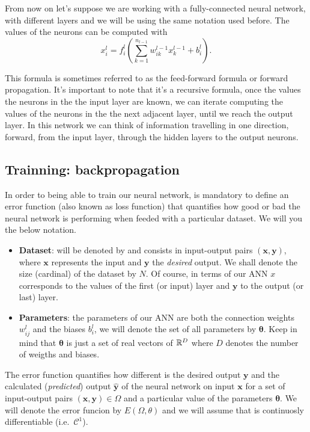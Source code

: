 From now on let's suppose we are working with a fully-connected neural network,
with different layers and we will be using the same notation used before. The
values of the neurons can be computed with
\begin{equation}
  x_i^l = f_i^l \left( \sum_{k=1}^{n_{l-1}} w_{ik}^{l-1} x_{k}^{l-1} + b_i^l \right).
\end{equation}

This formula is sometimes referred to as the feed-forward formula or forward
propagation. It's important to note that it's a recursive formula, once the
values the neurons in the the input layer are known, we can iterate computing
the values of the neurons in the the next adjacent layer, until we reach the
output layer. In this network we can think of information travelling in one
direction, forward, from the input layer, through the hidden layers to the
output neurons.

\subsection{Trainning: backpropagation}
\label{sec:backward}

In order to being able to train our neural network, is mandatory to define an
error function (also known as loss function) that quantifies how good or bad
the neural network is performing when feeded with a particular dataset. We will
you the below notation.
\begin{itemize}
  \item \textbf{Dataset}: will be denoted by and consists in input-output pairs
  \((\mathbf{x}, \mathbf{y})\), where \(\mathbf{x}\) represents the input and
  \(\mathbf{y}\) the \emph{desired} output. We shall denote the size (cardinal)
  of the dataset by \(N\). Of course, in terms of our ANN \(x\) corresponds to
  the values of the first (or input) layer and \(\mathbf{y}\) to the output (or
  last) layer.
  \item \textbf{Parameters}: the parameters of our ANN are both the connection
  weights \(w_{ij}^l\) and the biases \(b_i^l\), we will denote the set of all
  parameters by \(\bm{\theta}\). Keep in mind that \(\bm{\theta}\) is just a
  set of real vectors of \(\mathbb{R}^D\) where \(D\) denotes the number of weigths and
  biases.
\end{itemize}

The error function quantifies how different is the desired output
\(\mathbf{y}\) and the calculated (\emph{predicted}) output
\(\mathbf{\hat{y}}\) of the neural network on input \(\mathbf{x}\) for a set of
input-output pairs \((\mathbf{x}, \mathbf{y}) \in \Omega\) and a particular
value of the parameters \(\bm{\theta}\). We will denote the error funcion by
\(E(\Omega, \theta)\) and we will assume that is continuosly differentiable
(i.e.\ \(\mathcal{C}^1\)).


